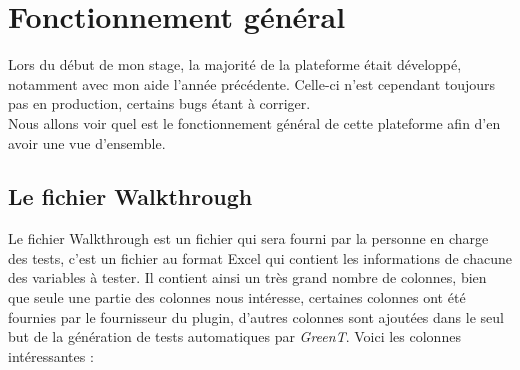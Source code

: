 	\section{Fonctionnement général}
Lors du début de mon stage, la majorité de la plateforme était développé, notamment avec mon aide l'année précédente. Celle-ci n'est cependant toujours pas en production, certains bugs étant à corriger. \\
Nous allons voir quel est le fonctionnement général de cette plateforme afin d'en avoir une vue d'ensemble.

	\subsection{Le fichier Walkthrough}\label{wt}
		Le fichier Walkthrough est un fichier qui sera fourni par la personne en charge des tests, c'est un fichier au format Excel qui contient les informations
		de chacune des variables à tester. Il contient ainsi un très grand nombre de colonnes, bien que seule une partie des colonnes nous intéresse, certaines colonnes ont été fournies par le fournisseur du plugin, d'autres colonnes sont ajoutées dans le seul but de la génération de tests automatiques par \textit{GreenT}. Voici les colonnes intéressantes : 

